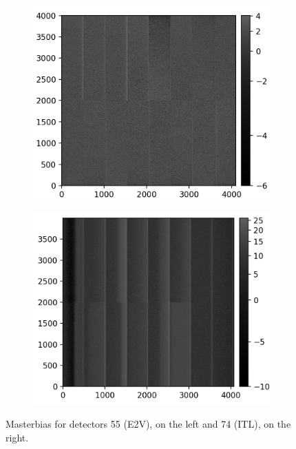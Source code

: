 \begin{figure}[!htb]
     \centering
     \begin{subfigure}[b]{0.49\textwidth}
         \centering
         \includegraphics[width=\textwidth]{Figures/Super_bias_55.png}
     \end{subfigure}
     \hfill
     \begin{subfigure}[b]{0.49\textwidth}
         \centering
         \includegraphics[width=\textwidth]{Figures/Super_bias_74.png}
     \end{subfigure}
        \caption{Masterbias for detectors 55 (E2V), on the left and 74 (ITL), on the right. }
        \label{fig:superbias}
\end{figure}

